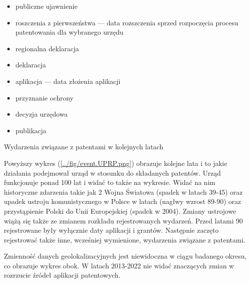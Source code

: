 \begin{multicols}{2}

\begin{itemize}
\item publiczne ujawnienie 
\item roszczenia z pierwszeństwa  --- 
      data rozszczenia sprzed rozpoczęcia procesu patentowania dla wybranego urzędu
\item regionalna deklaracja 
\item deklaracja 
\item aplikacja  --- data złożenia aplikacji
\item przyznanie ochrony 
\item decyzja urzędowa
\item publikacja
\end{itemize}

\columnbreak
{}
{Wydarzenia związane z patentami w kolejnych latach}

\end{multicols}

Powyższy wykres (\ref{../fig/event.UPRP.png}) obrazuje kolejne lata i to jakie
działania podejmował urząd w stosunku do składanych patentów. Urząd funkcjonuje
ponad 100 lat i widać to także na wykresie.
Widać na nim historyczne zdarzenia takie jak 2 Wojna Światowa (spadek w latach 39-45) 
oraz upadek ustroju komunistycznego w Polsce w latach (nagłwy wzrost 89-90) oraz
przystąpienie Polski do Unii Europejskiej (spadek w 2004).
Zmiany ustrojowe wiążą się także ze zmianem rozkładu rejestrowanych wydarzeń.
Przed latami 90 rejestrowane były wyłącznie daty aplikacji i grantów.
Następnie zaczęto rejestrować także inne, wcześniej wymienione, 
wydarzenia związane z patentami.

\newpage
\begin{multicols}{2}

Zmienność danych geolokalizacyjnych jest niewidoczna w ciągu badanego okresu, co obrazuje
wykres obok. W latach 2013-2022 nie widać znaczących zmian w rozrzucie źródeł
aplikacji patentowych.

\columnbreak
{}

\end{multicols}



